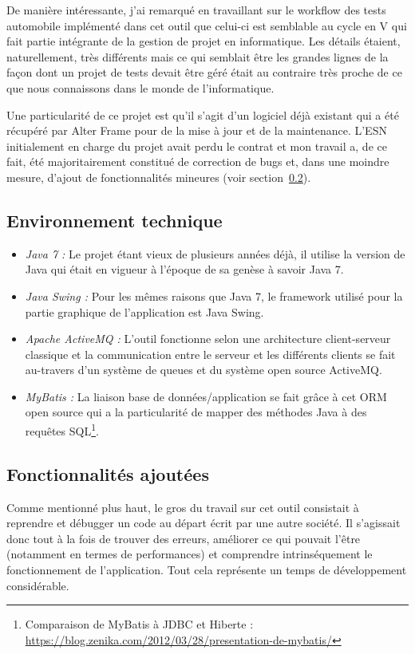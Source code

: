 De manière intéressante, j'ai remarqué en travaillant sur le workflow des tests automobile implémenté dans cet outil que celui-ci est semblable au cycle en V qui fait partie intégrante de la gestion de projet en informatique. Les détails étaient, naturellement, très différents mais ce qui semblait être les grandes lignes de la façon dont un projet de tests devait être géré était au contraire très proche de ce que nous connaissons dans le monde de l'informatique.

Une particularité de ce projet est qu'il s'agit d'un logiciel déjà existant qui a été récupéré par Alter Frame pour de la mise à jour et de la maintenance. L'ESN initialement en charge du projet avait perdu le contrat et mon travail a, de ce fait, été majoritairement constitué de correction de bugs et, dans une moindre mesure, d'ajout de fonctionnalités mineures (voir section~\ref{subsec:ajout}).

\subsection{Environnement technique}
\begin{itemize}[label=$\bullet$]
	\item \emph{Java 7 :} Le projet étant vieux de plusieurs années déjà, il utilise la version de Java qui était en vigueur à l'époque de sa genèse à savoir Java 7.
	\item \emph{Java Swing\cite{swing_wiki} :} Pour les mêmes raisons que Java 7, le framework utilisé pour la partie graphique de l'application est Java Swing.
	\item \emph{Apache ActiveMQ\cite{activemq} :} L'outil fonctionne selon une architecture client-serveur classique et la communication entre le serveur et les différents clients se fait au-travers d'un système de queues et du système open source ActiveMQ.
	\item \emph{MyBatis\cite{mybatis} :} La liaison base de données/application se fait grâce à cet ORM open source qui a la particularité de mapper des méthodes Java à des requêtes SQL\footnote{Comparaison de MyBatis à JDBC et Hiberte : \url{https://blog.zenika.com/2012/03/28/presentation-de-mybatis/}}.
\end{itemize}

\subsection{Fonctionnalités ajoutées}
\label{subsec:ajout}
Comme mentionné plus haut, le gros du travail sur cet outil consistait à reprendre et débugger un code au départ écrit par une autre société. Il s'agissait donc tout à la fois de trouver des erreurs, améliorer ce qui pouvait l'être (notamment en termes de performances) et comprendre intrinséquement le fonctionnement de l'application. Tout cela représente un temps de développement considérable.

